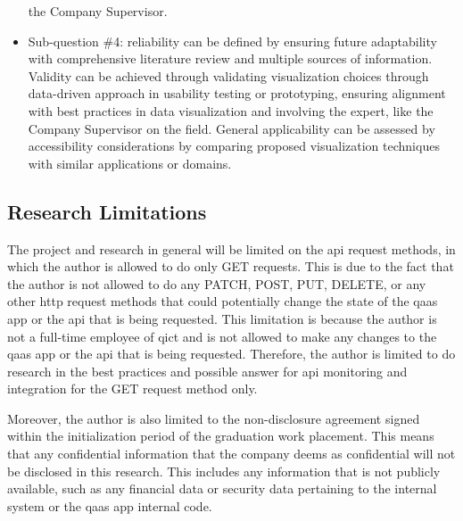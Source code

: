 \begin{multicols}{2}
\begin{itemize}[label=-]
                  the Company Supervisor.
            \item Sub-question \#4: reliability can be defined by ensuring future adaptability with comprehensive
                  literature review and multiple sources of information. Validity can be achieved through validating
                  visualization choices through data-driven approach in usability testing or  prototyping, ensuring
                  alignment with best practices in data visualization and involving the expert, like the Company
                  Supervisor on the field. General applicability can be assessed by accessibility considerations by
                  comparing proposed visualization techniques with similar applications or domains.
      \end{itemize}
      \subsection{Research Limitations}
      The project and research in general will be limited on the \acrshort{api} request methods, in which the author
      is allowed to do only GET requests. This is due to the fact that the author is not allowed to do any PATCH,
      POST, PUT, DELETE, or any other \acrshort{http} request methods that could potentially change the state of the
      \acrshort{qaas} app or the \acrshort{api} that is being requested. This limitation is because the author is not a
      full-time employee of \acrshort{qict} and is not allowed to make any changes to the \acrshort{qaas} app or the
      \acrshort{api} that is being requested. Therefore, the author is limited to do research in the best practices
      and possible answer for \acrshort{api} monitoring and integration for the GET request method only.

      Moreover, the author is also limited to the non-disclosure agreement signed within the initialization period of
      the graduation work placement. This means that any confidential information that the company deems as confidential
      will not be disclosed in this research. This includes any information that is not publicly available, such as any
      financial data or security data pertaining to the internal system or the \acrshort{qaas} app internal code.

\end{multicols}
